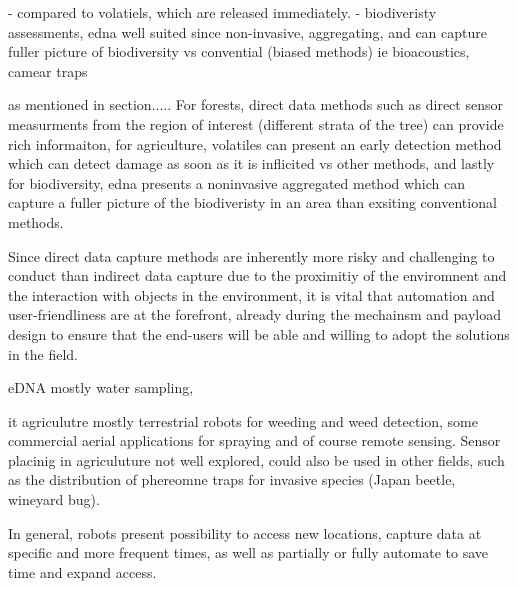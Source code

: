 - compared to volatiels, which are released immediately.
- biodiveristy assessments, edna well suited since non-invasive, aggregating, and can capture fuller picture of biodiversity vs convential (biased methods) ie bioacoustics, camear traps

as mentioned in section.....
For forests, direct data methods such as direct sensor measurments from the region of interest (different strata of the tree) can provide rich informaiton, for agriculture, volatiles can present an early detection method which can detect damage as soon as it is inflicited vs other methods, and lastly for biodiversity, edna presents a noninvasive aggregated method which can capture a fuller picture of the biodiveristy in an area than exsiting conventional methods.

Since direct data capture methods are inherently more risky and challenging to conduct than indirect data capture due to the proximitiy of the enviromnent and the interaction with objects in the environment, it is vital that automation and user-friendliness are at the forefront, already during the mechainsm and payload design to ensure that the end-users will be able and willing to adopt the solutions in the field.



 
eDNA mostly water sampling, %


it agriculutre mostly terrestrial robots for weeding and weed detection, some commercial aerial applications for spraying and of course remote sensing. Sensor placinig in agriculuture not well explored, could also be used in other fields, such as the distribution of phereomne traps for invasive species (Japan beetle, wineyard bug). %

In general, robots present possibility to access new locations, capture data at specific and more frequent times, as well as partially or fully automate to save time and expand access.


